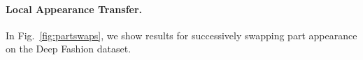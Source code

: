 \paragraph{Local Appearance Transfer.}
In Fig.~\ref{fig:partswaps}, we show  results for successively swapping part appearance on the Deep Fashion dataset.

